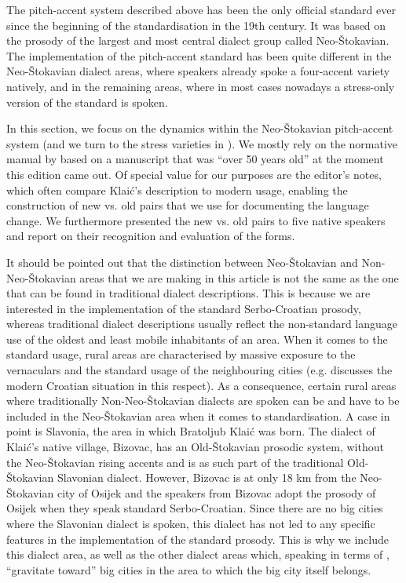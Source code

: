 \documentclass[output=paper,modfonts,nonflat
]{langsci/langscibook}
\begin{document}
The pitch-accent system described above has been the only official standard ever since the beginning of the standardisation in the 19th century. It was based on the prosody of the largest and most central dialect group called Neo-Štokavian. The implementation of the pitch-accent standard has been quite different in the Neo-Štokavian dialect areas, where speakers already spoke a four-accent variety natively, and in the remaining areas, where in most cases nowadays a stress-only version of the standard is spoken. 

In this section, we focus on the dynamics within the Neo-Štokavian pitch-accent system (and we turn to the stress varieties in ). We mostly rely on the normative manual by \citet[]{Klaic2013} based on a manuscript that was ``over 50 years old'' at the moment this edition came out. Of special value for our purposes are the editor's notes, which often compare Klaić's description to modern usage, enabling the construction of new vs. old pairs that we use for documenting the language change. We furthermore presented the new vs. old pairs to five native speakers and report on their recognition and evaluation of the forms.

It should be pointed out that the distinction between Neo-Štokavian and Non-Neo-Štokavian areas that we are making in this article is not the same as the one that can be found in traditional dialect descriptions. This is because we are interested in the implementation of the standard Serbo-Croatian prosody, whereas traditional dialect descriptions usually reflect the non-standard language use of the oldest and least mobile inhabitants of an area. When it comes to the standard usage, rural areas are characterised by massive exposure to the vernaculars and the standard usage of the neighbouring cities (e.g. \citealt{Kapović2004} discusses the modern Croatian situation in this respect). As a consequence, certain rural areas where traditionally Non-Neo-Štokavian dialects are spoken can be and have to be included in the Neo-Štokavian area when it comes to standardisation. A case in point is Slavonia, the area in which Bratoljub Klaić was born. The dialect of Klaić's native village, Bizovac, has an Old-Štokavian prosodic system, without the Neo-Štokavian rising accents \citep[19]{Klaic2007} and is as such part of the traditional Old-Štokavian Slavonian dialect. However, Bizovac is at only 18 km from the Neo-Štokavian city of Osijek and the speakers from Bizovac adopt the prosody of Osijek when they speak standard Serbo-Croatian. Since there are no big cities where the Slavonian dialect is spoken, this dialect has not led to any specific features in the implementation of the standard prosody. This is why we include this dialect area, as well as the other dialect areas which, speaking in terms of \citet{Kapović2004}, ``gravitate toward'' big cities in the area to which the big city itself belongs. 
\end{document}
